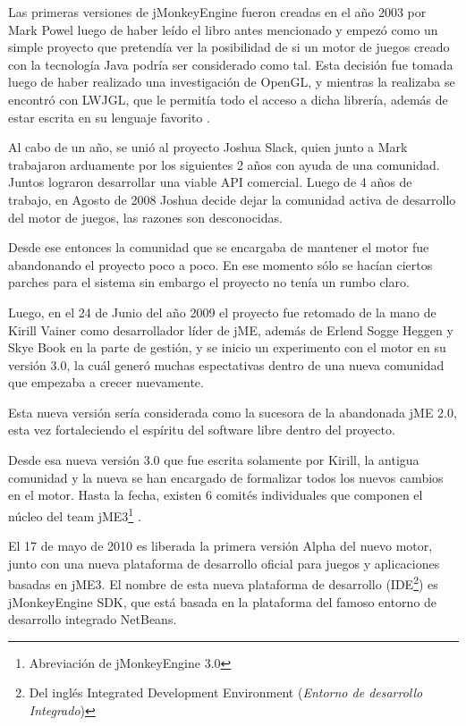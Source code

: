 \documentclass[a4paper,12pt,openany,oneside]{book}
\begin{document}
Las primeras versiones de jMonkeyEngine fueron creadas en el año 2003 por Mark Powel luego de haber leído el libro antes mencionado y empezó como un simple proyecto que pretendía ver la posibilidad de si un motor de juegos creado con la tecnología Java podría ser considerado como tal. Esta decisión fue tomada luego de haber realizado una investigación de OpenGL, y mientras la realizaba se encontró con LWJGL, que le permitía todo el acceso a dicha librería, además de estar escrita en su lenguaje favorito \cite{WIKI}. 

Al cabo de un año, se unió al proyecto Joshua Slack, quien junto a Mark trabajaron arduamente por los siguientes 2 años con ayuda de una comunidad. Juntos lograron desarrollar una viable API comercial. Luego de 4 años de trabajo, en Agosto de 2008 Joshua decide dejar la comunidad  activa de desarrollo del motor de juegos, las razones son desconocidas. 

Desde ese entonces la comunidad que se encargaba de mantener el motor fue abandonando el proyecto poco a poco. En ese momento sólo se hacían ciertos parches para el sistema sin embargo el proyecto no tenía un rumbo claro.

Luego, en el 24 de Junio del año 2009 el proyecto fue retomado de la mano de Kirill Vainer como desarrollador líder de jME, además de Erlend Sogge Heggen y Skye Book en la parte de gestión, y se inicio un experimento con el motor en su versión 3.0, la cuál generó muchas espectativas dentro de una nueva comunidad que empezaba a crecer nuevamente. 

Esta nueva versión sería considerada como la sucesora de la abandonada jME 2.0, esta vez fortaleciendo el espíritu del software libre dentro del proyecto.

Desde esa nueva versión 3.0 que fue escrita solamente por Kirill, la antigua comunidad y la nueva se han encargado de formalizar todos los nuevos cambios en el motor. Hasta la fecha, existen 6 comités individuales que componen el núcleo del team jME3\footnote{Abreviación de jMonkeyEngine 3.0} \cite{BOOK}.

El 17 de mayo de 2010 es liberada la primera versión Alpha del nuevo motor, junto con una nueva plataforma de desarrollo oficial para juegos y aplicaciones basadas en jME3. El nombre de esta nueva plataforma de desarrollo (IDE\footnote{Del inglés Integrated Development Environment (\textit{Entorno de desarrollo Integrado})}) es jMonkeyEngine SDK, que está basada en la plataforma del famoso entorno de desarrollo integrado NetBeans.
\end{document}
